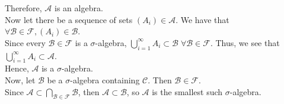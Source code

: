 \documentclass[12pt]{article}
\begin{document}
Therefore, $\mathscr{A}$ is an algebra.\\

Now let there be a sequence of sets $(A_i) \in \mathscr{A}$. We have that $\forall \mathscr{B} \in \mathscr{F}, (A_i) \in \mathscr{B}$.\\

Since every $\mathscr{B} \in \mathscr{F}$ is a $\sigma$-algebra, $\bigcup\limits_{i=1}^{\infty} A_{i} \subset \mathscr{B} \; \forall \mathscr{B} \in \mathscr{F}$. Thus, we see that $\bigcup\limits_{i=1}^{\infty} A_{i} \subset \mathscr{A}$.\\

Hence, $\mathscr{A}$ is a $\sigma$-algebra.\\

Now, let $\mathscr{B}$ be a $\sigma$-algebra containing $\mathscr{C}$. Then $\mathscr{B} \in \mathscr{F}$.\\

Since $\mathscr{A} \subset \bigcap\limits_{\mathscr{B} \in \mathscr{F}} \mathscr{B}$, then $\mathscr{A} \subset \mathscr{B}$, so $\mathscr{A}$ is the smallest such $\sigma$-algebra.
\end{document}
